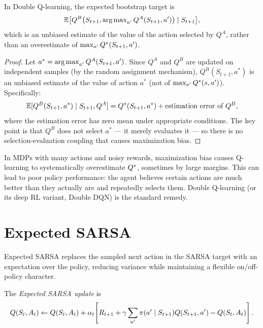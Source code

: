 \documentclass[11pt,a4paper]{article}
\begin{document}
\begin{proposition}
\label{prop:double_unbiased}
In Double Q-learning, the expected bootstrap target is
\begin{equation}
  \mathbb{E}\bigl[Q^B\bigl(S_{t+1}, \operatorname{arg\,max}_{a'} Q^A(S_{t+1}, a')\bigr)
    \mid S_{t+1}\bigr],
  \label{eq:double_target}
\end{equation}
which is an unbiased estimate of the value of the action selected
by $Q^A$, rather than an overestimate of $\max_{a'} Q^*(S_{t+1},
a')$.
\end{proposition}

\begin{proof}
Let $a^* = \operatorname{arg\,max}_{a'} Q^A(S_{t+1}, a')$. Since $Q^A$ and $Q^B$
are updated on independent samples (by the random assignment
mechanism), $Q^B(S_{t+1}, a^*)$ is an unbiased estimate of
the value of action $a^*$ (not of $\max_{a'} Q^*(s,a')$).
Specifically:
\begin{equation}
  \mathbb{E}[Q^B(S_{t+1}, a^*) \mid S_{t+1}, Q^A]
  = Q^*(S_{t+1}, a^*) + \text{estimation error of } Q^B,
\end{equation}
where the estimation error has zero mean under appropriate
conditions. The key point is that $Q^B$ does not select $a^*$ ---
it merely evaluates it --- so there is no selection-evaluation
coupling that causes maximization bias.
\end{proof}

\begin{warning}[title={Q-Learning Can Significantly Overestimate Values}]
In MDPs with many actions and noisy rewards, maximization bias
causes Q-learning to systematically overestimate $Q^*$,
sometimes by large margins. This can lead to poor policy
performance: the agent believes certain actions are much better
than they actually are and repeatedly selects them. Double
Q-learning (or its deep RL variant, Double DQN) is the standard
remedy.
\end{warning}

\section{Expected SARSA}
\label{sec:expected_sarsa}

Expected SARSA replaces the sampled next action in the SARSA target
with an expectation over the policy, reducing variance while
maintaining a flexible on/off-policy character.

\begin{definition}
\label{def:expected_sarsa}
The \emph{Expected SARSA update} is
\begin{equation}
  Q(S_t, A_t) \leftarrow Q(S_t, A_t)
  + \alpha_t\!\left[R_{t+1}
  + \gamma \sum_{a'} \pi(a' \mid S_{t+1}) Q(S_{t+1}, a')
  - Q(S_t, A_t)\right].
  \label{eq:expected_sarsa}
\end{equation}
\end{definition}
\end{document}
